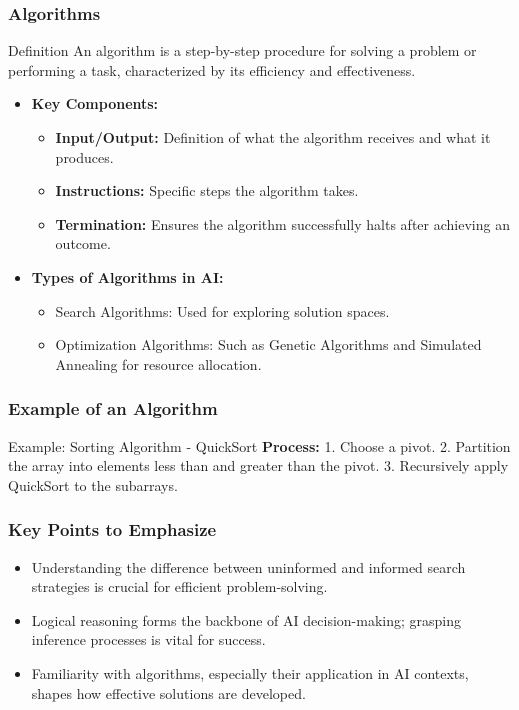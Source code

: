 \documentclass[aspectratio=169]{beamer}
\begin{document}
\begin{frame}[fragile]
    \frametitle{Algorithms}
    \begin{block}{Definition}
        An algorithm is a step-by-step procedure for solving a problem or performing a task, characterized by its efficiency and effectiveness.
    \end{block}

    \begin{itemize}
        \item \textbf{Key Components:}
            \begin{itemize}
                \item \textbf{Input/Output:} Definition of what the algorithm receives and what it produces.
                \item \textbf{Instructions:} Specific steps the algorithm takes.
                \item \textbf{Termination:} Ensures the algorithm successfully halts after achieving an outcome.
            \end{itemize}
    
        \item \textbf{Types of Algorithms in AI:}
            \begin{itemize}
                \item Search Algorithms: Used for exploring solution spaces.
                \item Optimization Algorithms: Such as Genetic Algorithms and Simulated Annealing for resource allocation.
            \end{itemize}
    \end{itemize}
\end{frame}

\begin{frame}[fragile]
    \frametitle{Example of an Algorithm}
    \begin{exampleblock}{Example: Sorting Algorithm - QuickSort}
        \textbf{Process:} 
        1. Choose a pivot.
        2. Partition the array into elements less than and greater than the pivot.
        3. Recursively apply QuickSort to the subarrays.
    \end{exampleblock}
\end{frame}

\begin{frame}[fragile]
    \frametitle{Key Points to Emphasize}
    \begin{itemize}
        \item Understanding the difference between uninformed and informed search strategies is crucial for efficient problem-solving.
        \item Logical reasoning forms the backbone of AI decision-making; grasping inference processes is vital for success.
        \item Familiarity with algorithms, especially their application in AI contexts, shapes how effective solutions are developed.
    \end{itemize}
\end{frame}
\end{document}
